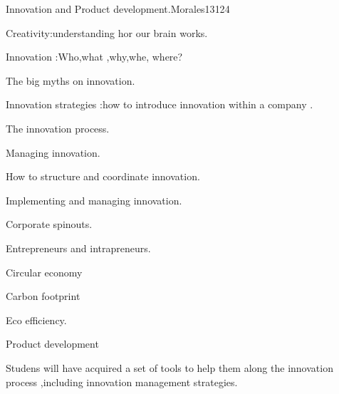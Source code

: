 \begin{syllabus}
\begin{competences}
    \item {}
    \item {}
    \item {}
    \item {}
\end{competences}


\begin{unit}{Innovation and Product development.}{}{Morales13}{12}{4}
   \begin{topics}
      \item Creativity:understanding hor our brain works.
      \item Innovation :Who,what ,why,whe, where?
      \item The big myths on innovation.
      \item Innovation strategies :how to introduce innovation within a company .
      \item The innovation process.
      \item Managing innovation.
      \item How to structure and coordinate innovation.
      \item Implementing and managing innovation.
      \item Corporate spinouts.
      \item Entrepreneurs and intrapreneurs.
      \item Circular economy
      \item Carbon footprint
      \item Eco efficiency.
      \item Product development 
      
   \end{topics}
   \begin{learningoutcomes}
      \item Studens will have  acquired a set of tools to help them along the innovation process ,including innovation management strategies.
   \end{learningoutcomes}
\end{unit}

\begin{coursebibliography}
\end{coursebibliography}

\end{syllabus}
